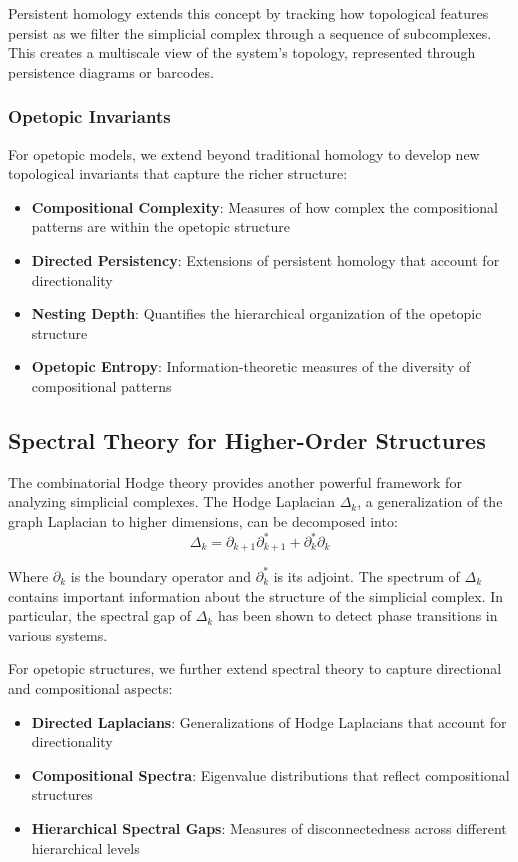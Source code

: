 Persistent homology extends this concept by tracking how topological features persist as we filter the simplicial complex through a sequence of subcomplexes. This creates a multiscale view of the system's topology, represented through persistence diagrams or barcodes.

\subsubsection{Opetopic Invariants}
For opetopic models, we extend beyond traditional homology to develop new topological invariants that capture the richer structure:

\begin{itemize}
    \item \textbf{Compositional Complexity}: Measures of how complex the compositional patterns are within the opetopic structure
    \item \textbf{Directed Persistency}: Extensions of persistent homology that account for directionality
    \item \textbf{Nesting Depth}: Quantifies the hierarchical organization of the opetopic structure
    \item \textbf{Opetopic Entropy}: Information-theoretic measures of the diversity of compositional patterns
\end{itemize}

\subsection{Spectral Theory for Higher-Order Structures}
The combinatorial Hodge theory provides another powerful framework for analyzing simplicial complexes. The Hodge Laplacian $\Delta_k$, a generalization of the graph Laplacian to higher dimensions, can be decomposed into:
\begin{equation}
\Delta_k = \partial_{k+1}\partial_{k+1}^* + \partial_k^*\partial_k
\end{equation}

Where $\partial_k$ is the boundary operator and $\partial_k^*$ is its adjoint. The spectrum of $\Delta_k$ contains important information about the structure of the simplicial complex. In particular, the spectral gap of $\Delta_k$ has been shown to detect phase transitions in various systems.

For opetopic structures, we further extend spectral theory to capture directional and compositional aspects:

\begin{itemize}
    \item \textbf{Directed Laplacians}: Generalizations of Hodge Laplacians that account for directionality
    \item \textbf{Compositional Spectra}: Eigenvalue distributions that reflect compositional structures
    \item \textbf{Hierarchical Spectral Gaps}: Measures of disconnectedness across different hierarchical levels
\end{itemize}

